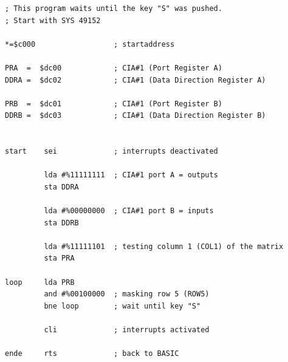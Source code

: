 \documentclass[final, ms, a4paper, 11pt]{memoir}
\begin{document}
\begin{centering}\begin{verbatim}
; This program waits until the key "S" was pushed.
; Start with SYS 49152

*=$c000                  ; startaddress 

PRA  =  $dc00            ; CIA#1 (Port Register A)
DDRA =  $dc02            ; CIA#1 (Data Direction Register A)

PRB  =  $dc01            ; CIA#1 (Port Register B)
DDRB =  $dc03            ; CIA#1 (Data Direction Register B)


start    sei             ; interrupts deactivated

         lda #%11111111  ; CIA#1 port A = outputs 
         sta DDRA             

         lda #%00000000  ; CIA#1 port B = inputs
         sta DDRB             

         lda #%11111101  ; testing column 1 (COL1) of the matrix
         sta PRA
            
loop     lda PRB
         and #%00100000  ; masking row 5 (ROW5) 
         bne loop        ; wait until key "S" 

         cli             ; interrupts activated

ende     rts             ; back to BASIC
\end{verbatim}\end{centering}
\end{document}
